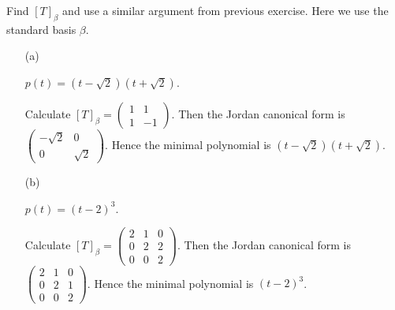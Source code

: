 \begin{Exercise}
	Find $[T]_{\beta}$ and use a similar argument from previous exercise. Here we use the standard basis $\beta$.
	\begin{enumerate}[(a)]
		\item[(a)]
		\begin{answer}
			$p(t) = (t-\sqrt{2})(t+\sqrt{2})$. 	
		\end{answer}
		\begin{solution}
			Calculate $[T]_{\beta} = \begin{pmatrix}
			1 & 1 \\
			1 & -1
			\end{pmatrix}$.
			Then the Jordan canonical form is $\begin{pmatrix}
			-\sqrt{2} & 0 \\
			0 & \sqrt{2}
			\end{pmatrix}$.
			Hence the minimal polynomial is $(t-\sqrt{2})(t+\sqrt{2})$.
		\end{solution}
		
		\item[(b)]
		\begin{answer}
			$p(t) = (t-2)^3$. 	
		\end{answer}
		\begin{solution}	
			Calculate $[T]_{\beta} = \begin{pmatrix}
			2 & 1 & 0 \\
			0 & 2 & 2 \\
			0 & 0 & 2
			\end{pmatrix}$.
			Then the Jordan canonical form is $\begin{pmatrix}
			2 & 1 & 0 \\
			0 & 2 & 1 \\
			0 & 0 & 2
			\end{pmatrix}$.
			Hence the minimal polynomial is $(t-2)^3$.
		\end{solution}
		

\end{enumerate}
\end{Exercise}
